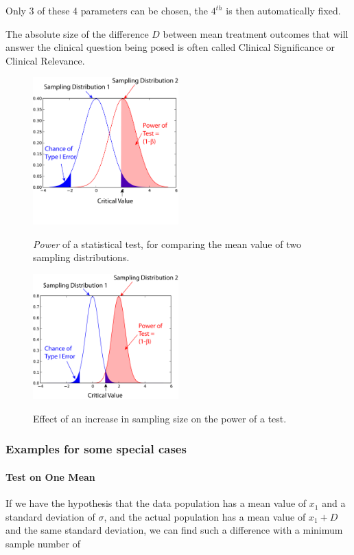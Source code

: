 Only 3 of these 4 parameters can be chosen, the $4^{th}$ is then automatically fixed.

The absolute size of the difference $D$ between mean treatment outcomes that will answer the clinical question being posed is often called Clinical Significance or Clinical Relevance.

\begin{figure}[!ht]
  \centering
  \includegraphics[width=0.5\textwidth]{../Images/power1.png}\\
  \caption{\emph{Power} of a statistical test, for comparing the mean value of two sampling distributions.}\label{fig:power1}
\end{figure}

\begin{figure}[!ht]
  \centering
  \includegraphics[width=0.5\textwidth]{../Images/power2.png}\\
  \caption{Effect of an increase in sampling size on the power of a test.}\label{fig:power2}
\end{figure}

\subsubsection{Examples for some special cases}

\paragraph{Test on One Mean}
If we have the hypothesis that the data population has a mean value of $x_1$ and a standard deviation of $\sigma$, and the actual population has a mean value of $x_1+D$ and the same standard deviation, we can find such a difference with a minimum sample number of

